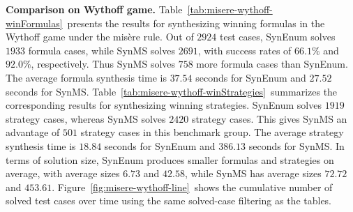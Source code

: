 \documentclass[review]{elsarticle}
\begin{document}
\textbf{Comparison on Wythoff game.}
Table~\ref{tab:misere-wythoff-winFormulas}~presents the results for synthesizing winning formulas in the Wythoff game under the mis\`{e}re rule.
Out of $2924$ test cases, SynEnum solves $1933$ formula cases, while SynMS solves $2691$, with success rates of $66.1\%$ and $92.0\%$, respectively.
Thus SynMS solves $758$ more formula cases than SynEnum.
The average formula synthesis time is $37.54$ seconds for SynEnum and $27.52$ seconds for SynMS.
Table~\ref{tab:misere-wythoff-winStrategies}~summarizes the corresponding results for synthesizing winning strategies.
SynEnum solves $1919$ strategy cases, whereas SynMS solves $2420$ strategy cases.
This gives SynMS an advantage of $501$ strategy cases in this benchmark group.
The average strategy synthesis time is $18.84$ seconds for SynEnum and $386.13$ seconds for SynMS.
In terms of solution size, SynEnum produces smaller formulas and strategies on average, with average sizes $6.73$ and $42.58$, while SynMS has average sizes $72.72$ and $453.61$.
Figure~\ref{fig:misere-wythoff-line}~shows the cumulative number of solved test cases over time using the same solved-case filtering as the tables.
\end{document}
